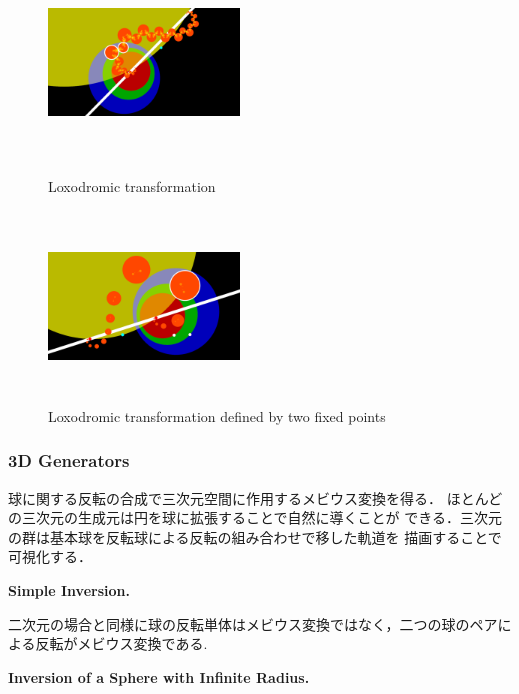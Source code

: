 \begin{figure}[htbp]
 \begin{minipage}[t]{0.5\hsize}
  \center
   \includegraphics[width=2in, height=2in, keepaspectratio]{../img/klein/2diis/loxoEdged.pdf}
   \caption{Loxodromic transformation}
   \label{fig:loxodromic2d}
 \end{minipage}
 \begin{minipage}[t]{0.5\hsize}
  \center
  \includegraphics[width=2in, height=2in,
  keepaspectratio]{../img/klein/2diis/loxoFixedEdged.pdf}
  \caption{Loxodromic transformation defined by two fixed points}
  \label{fig:loxoFixed}
 \end{minipage}
\end{figure}

\subsubsection{3D Generators}

球に関する反転の合成で三次元空間に作用するメビウス変換を得る．
ほとんどの三次元の生成元は円を球に拡張することで自然に導くことが
できる．三次元の群は基本球を反転球による反転の組み合わせで移した軌道を
描画することで可視化する．

\noindent\textbf{Simple Inversion.}

二次元の場合と同様に球の反転単体はメビウス変換ではなく，二つの球のペアに
よる反転がメビウス変換である.

\noindent\textbf{Inversion of a Sphere with Infinite Radius.}

